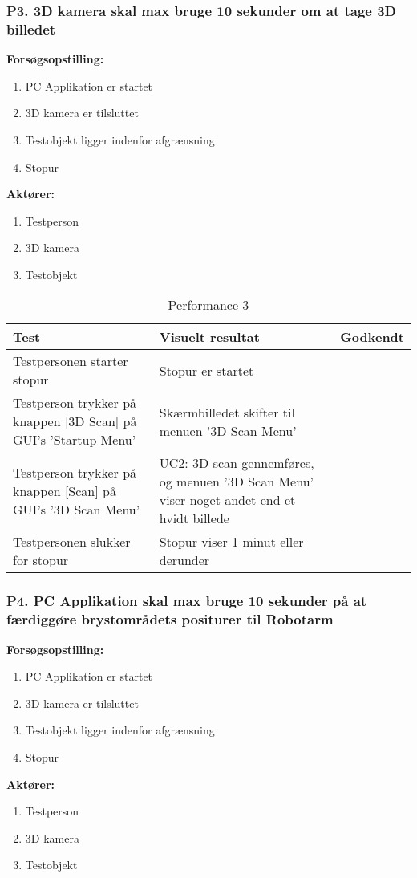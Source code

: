 \subsubsection{P3. 3D kamera skal max bruge 10 sekunder om at tage 3D billedet}
\textbf{Forsøgsopstilling:}
\begin{enumerate}
\item PC Applikation er startet
\item 3D kamera er tilsluttet
\item Testobjekt ligger indenfor afgrænsning
\item Stopur
\end{enumerate}
\textbf{Aktører:}
\begin{enumerate}
\item Testperson
\item 3D kamera 
\item Testobjekt
\end{enumerate}

\begin{table}[htb]
\begin{tabularx}{\textwidth}{|X|X|p{2cm}|}
\hline
\textbf{Test} & \textbf{Visuelt resultat} &\textbf{Godkendt}\\\hline  
Testpersonen starter stopur & Stopur er startet & \\ \hline
Testperson trykker på knappen [3D Scan] på GUI's 'Startup Menu' & Skærmbilledet skifter til menuen '3D Scan Menu' &  \\\hline
Testperson trykker på knappen [Scan] på GUI's '3D Scan Menu' & UC2: 3D scan gennemføres, og menuen '3D Scan Menu' viser noget andet end et hvidt billede & \\\hline
Testpersonen slukker for stopur & Stopur viser 1 minut eller derunder & \\\hline
\end{tabularx}
\caption{Performance 3}
\label{P3}
\end{table}
\newpage

\subsubsection{P4. PC Applikation skal max bruge 10 sekunder på at færdiggøre brystområdets positurer til Robotarm}
\textbf{Forsøgsopstilling:}
\begin{enumerate}
\item PC Applikation er startet
\item 3D kamera er tilsluttet
\item Testobjekt ligger indenfor afgrænsning
\item Stopur
\end{enumerate}
\textbf{Aktører:}
\begin{enumerate}
\item Testperson 
\item 3D kamera 
\item Testobjekt
\end{enumerate}


